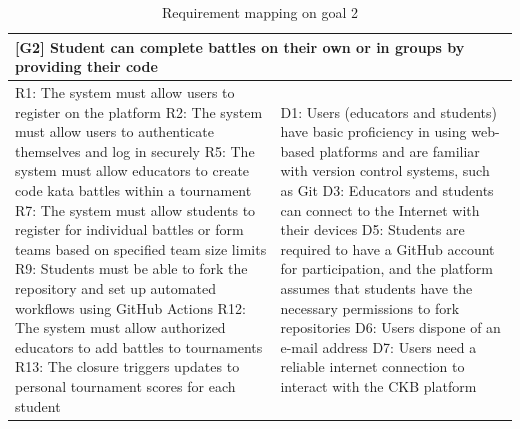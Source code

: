 \begin{table}[h!]
    \centering
    \begin{tabular}{|p{8cm}|p{8cm}|}
    \hline
        \multicolumn{2}{|p{16cm}|}{\textbf{[G2] Student can complete battles on their own or in groups by providing their code}} \\
    \hline
        R1: The system must allow users to register on the platform \newline
        R2: The system must allow users to authenticate themselves and log in securely \newline
        R5: The system must allow educators to create code kata battles within a tournament \newline
        R7: The system must allow students to register for individual battles or form teams based on specified team size limits \newline
        R9: Students must be able to fork the repository and set up automated workflows using GitHub Actions \newline
        R12: The system must allow authorized educators to add battles to tournaments \newline 
        R13: The closure triggers updates to personal tournament scores for each student 
        &
        D1: Users (educators and students) have basic proficiency in using web-based platforms and are familiar with version control systems, such as Git \newline 
        D3: Educators and students can connect to the Internet with their devices \newline
        D5: Students are required to have a GitHub account for participation, and the platform assumes that students have the necessary permissions to fork repositories\newline
        D6: Users dispone of an e-mail address \newline
        D7: Users need a reliable internet connection to interact with the CKB platform\newline
        \\
    \hline
    \end{tabular}
    \caption{Requirement mapping on goal 2}
    \label{tab:g2}
\end{table}
